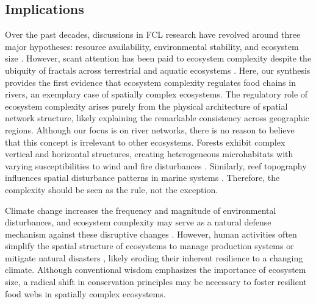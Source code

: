 \documentclass[11pt, class=article, crop=false]{standalone}
\begin{document}
\subsection{Implications}
Over the past decades, discussions in FCL research have revolved around three major hypotheses: resource availability, environmental stability, and ecosystem size \citep{oksanen_exploitation_1981, pimm_number_1977, schoener_food_1989}.
However, scant attention has been paid to ecosystem complexity despite the ubiquity of fractals across terrestrial \citep{turner_landscape_2015} and aquatic ecosystems \citep{rodriguez-iturbe_fractal_2001}.
Here, our synthesis provides the first evidence that ecosystem complexity regulates food chains in rivers, an exemplary case of spatially complex ecosystems.
The regulatory role of ecosystem complexity arises purely from the physical architecture of spatial network structure, likely explaining the remarkable consistency across geographic regions.
Although our focus is on river networks, there is no reason to believe that this concept is irrelevant to other ecosystems.
Forests exhibit complex vertical and horizontal structures, creating heterogeneous microhabitats with varying susceptibilities to wind and fire disturbances \citep{peterson_contagious_2002, cansler_climate_2014}.
Similarly, reef topography influences spatial disturbance patterns in marine systems \citep{connell_30year_1997}.
Therefore, the complexity should be seen as the rule, not the exception.

Climate change increases the frequency and magnitude of environmental disturbances, and ecosystem complexity may serve as a natural defense mechanism against these disruptive changes \citep{terui_metapopulation_2018, terui_emergent_2021, pomeranz_ecosystem_2023}.
However, human activities often simplify the spatial structure of ecosystems to manage production systems or mitigate natural disasters \citep{turner_landscape_2015, grill_mapping_2019, elmore_disappearing_2008}, likely eroding their inherent resilience to a changing climate.
Although conventional wisdom emphasizes the importance of ecosystem size, a radical shift in conservation principles may be necessary to foster resilient food webs in spatially complex ecosystems.
\end{document}
